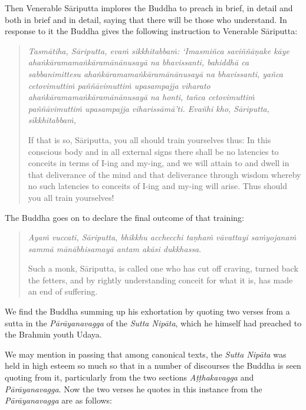 Then Venerable Sāriputta implores the Buddha to preach in brief, in detail and both in brief and in detail, saying that there will be those who understand. In response to it the Buddha gives the following instruction to Venerable Sāriputta:

\begin{quote}
\emph{Tasmātiha, Sāriputta, evaṁ sikkhitabbaṁ: `Imasmiñca saviññāṇake kāye ahaṅkāramamaṅkāramānānusayā na bhavissanti, bahiddhā ca sabbanimittesu ahaṅkāramamaṅkāramānānusayā na bhavissanti, yañca cetovimuttiṁ paññāvimuttiṁ upasampajja viharato ahaṅkāramamaṅkāramānānusayā na honti, tañca cetovimuttiṁ paññāvimuttiṁ upasampajja viharissāmā'ti. Evañhi kho, Sāriputta, sikkhitabbaṁ,}

If that is so, Sāriputta, you all should train yourselves thus: In this conscious body and in all external signs there shall be no latencies to conceits in terms of I-ing and my-ing, and we will attain to and dwell in that deliverance of the mind and that deliverance through wisdom whereby no such latencies to conceits of I-ing and my-ing will arise. Thus should you all train yourselves!
\end{quote}

The Buddha goes on to declare the final outcome of that training:

\begin{quote}
\emph{Ayaṁ vuccati, Sāriputta, bhikkhu acchecchi taṇhaṁ vāvattayi saṁyojanaṁ sammā mānābhisamayā antam akāsi dukkhassa}.

Such a monk, Sāriputta, is called one who has cut off craving, turned back the fetters, and by rightly understanding conceit for what it is, has made an end of suffering.
\end{quote}

We find the Buddha summing up his exhortation by quoting two verses from a sutta in the \emph{Pārāyanavagga} of the \emph{Sutta Nipāta}, which he himself had preached to the Brahmin youth Udaya.

We may mention in passing that among canonical texts, the \emph{Sutta Nipāta} was held in high esteem so much so that in a number of discourses the Buddha is seen quoting from it, particularly from the two sections \emph{Aṭṭhakavagga} and \emph{Pārāyanavagga}. Now the two verses he quotes in this instance from the \emph{Pārāyanavagga} are as follows:

